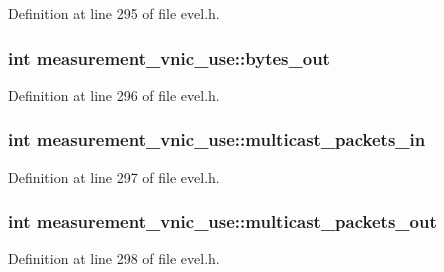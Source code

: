 Definition at line 295 of file evel.\+h.

\hypertarget{structmeasurement__vnic__use_a3531ca46c61940621cea0f4d34f58855}{}
\subsubsection[{bytes\+\_\+out}]{\setlength{\rightskip}{0pt plus 5cm}int measurement\+\_\+vnic\+\_\+use\+::bytes\+\_\+out}\label{structmeasurement__vnic__use_a3531ca46c61940621cea0f4d34f58855}


Definition at line 296 of file evel.\+h.

\hypertarget{structmeasurement__vnic__use_af469a84518524df99c6b524aa354521e}{}
\subsubsection[{multicast\+\_\+packets\+\_\+in}]{\setlength{\rightskip}{0pt plus 5cm}int measurement\+\_\+vnic\+\_\+use\+::multicast\+\_\+packets\+\_\+in}\label{structmeasurement__vnic__use_af469a84518524df99c6b524aa354521e}


Definition at line 297 of file evel.\+h.

\hypertarget{structmeasurement__vnic__use_a58b4b8efe4751047d156bb0df424b4c5}{}
\subsubsection[{multicast\+\_\+packets\+\_\+out}]{\setlength{\rightskip}{0pt plus 5cm}int measurement\+\_\+vnic\+\_\+use\+::multicast\+\_\+packets\+\_\+out}\label{structmeasurement__vnic__use_a58b4b8efe4751047d156bb0df424b4c5}


Definition at line 298 of file evel.\+h.

\hypertarget{structmeasurement__vnic__use_a674d1200ae67a951e79887bda5f4d48e}{}
